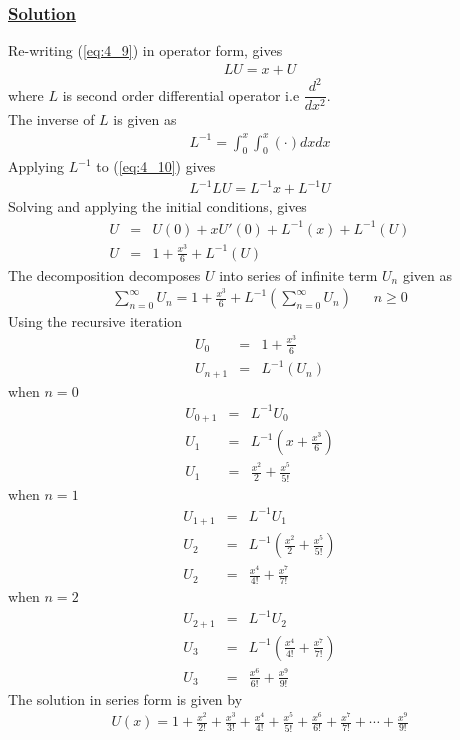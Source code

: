 \documentclass[11pt]{report}
\newcommand{\ubt}[1]{\textbf{\underline{#1}}}
\newcommand{\sps}{\\[0.2cm]}
\newcommand{\refn}[1]{(\ref{#1})}
\newcommand{\refx}[1]{\refn{eq:#1}}
\newcommand{\dsp}{\displaystyle}
\newcommand{\sprime}{'}
\newcommand{\solution}{\subsubsection{\ubt{Solution}}}
\begin{document}
	\solution
	Re-writing \refx{4_9} in operator form, gives
	\begin{eqnarray}
		LU = x+U\label{eq:4_10}
	\end{eqnarray}
	where $L$ is second order differential operator i.e $\dsp\dfrac{d^2}{dx^2}$. \\
	The inverse of $L$ is given as
	\begin{eqnarray}
		L^{-1} = \int_0^x\int_0^x(\cdot)dxdx
	\end{eqnarray}
	Applying $L^{-1}$ to \refx{4_10} gives
	\begin{eqnarray}
		L^{-1}LU = L^{-1}x + L^{-1}U
	\end{eqnarray}
	Solving and applying the initial conditions, gives
	\begin{eqnarray}
		U &=&U(0) + xU\sprime(0) + L^{-1}(x) + L^{-1}(U)\sps
		U &=& 1 + \frac{x^3}{6} + L^{-1}(U)\label{eq:4_14}
	\end{eqnarray}
	The decomposition decomposes $U$ into series of infinite term $U_n$ given as
	\begin{eqnarray}
		\sum_{n=0}^{\infty}U_n = 1 + \frac{x^3}{6}+ L^{-1}\left(\sum_{n=0}^\infty U_n\right)~~~~~~~ n \geq 0
	\end{eqnarray}
	Using the recursive iteration
	\begin{eqnarray*}
		U_0 &=& 1 + \frac{x^3}{6}\sps
		U_{n+1} &=& L^{-1}(U_n)
	\end{eqnarray*}
	when $n=0$
	\begin{eqnarray*}
		U_{0+1} & =& L^{-1} U_0\sps
		U_1 &=& L^{-1}\left(x + \frac{x^3}{6}\right)\sps
		U_1 &=& \frac{x^2}{2} + \frac{x^5}{5!}
	\end{eqnarray*}
	when $n=1$
	\begin{eqnarray*}
		U_{1+1} & =& L^{-1}U_1\sps
		U_2 &=& L^{-1}\left(\frac{x^2}{2}+\frac{x^5}{5!}\right)\sps
		U_2 &=& \frac{x^4}{4!} + \frac{x^7}{7!}
	\end{eqnarray*}
	when $n=2$
	\begin{eqnarray*}
		U_{2+1} &=& L^{-1}U_2\sps
		U_3 &=& L^{-1}\left(\frac{x^4}{4!}+ \frac{x^7}{7!}\right)\sps
		U_3 &=& \frac{x^6}{6!} + \frac{x^9}{9!}
	\end{eqnarray*}
	The solution in series form is given by 
	\begin{eqnarray*}
		U(x) = 1 + \frac{x^2}{2!} + \frac{x^3}{3!} + \frac{x^4}{4!} + \frac{x^5}{5!} + \frac{x^6}{6!} + \frac{x^7}{7!} + \cdots + \frac{x^9}{9!}
	\end{eqnarray*}
	\newpage
\end{document}
